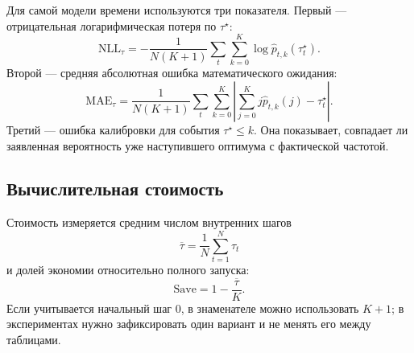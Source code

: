 Для самой модели времени используются три показателя. Первый --- отрицательная логарифмическая потеря по \(\tau^\star\):
\begin{equation}
  \mathrm{NLL}_{\tau}=-\frac{1}{N(K+1)}\sum_t\sum_{k=0}^{K}\log\widehat p_{t,k}(\tau_t^\star).
  \label{eq:tau_nll}
\end{equation}
Второй --- средняя абсолютная ошибка математического ожидания:
\begin{equation}
  \mathrm{MAE}_{\tau}=\frac{1}{N(K+1)}\sum_t\sum_{k=0}^{K}
  \left|\sum_{j=0}^{K}j\widehat p_{t,k}(j)-\tau_t^\star\right|.
  \label{eq:tau_mae}
\end{equation}
Третий --- ошибка калибровки для события \(\tau^\star\le k\). Она показывает, совпадает ли заявленная вероятность уже наступившего оптимума с фактической частотой.

\subsection{Вычислительная стоимость}

Стоимость измеряется средним числом внутренних шагов
\begin{equation}
  \overline\tau=\frac{1}{N}\sum_{t=1}^{N}\tau_t
  \label{eq:mean_tau}
\end{equation}
и долей экономии относительно полного запуска:
\begin{equation}
  \mathrm{Save}=1-\frac{\overline\tau}{K}.
  \label{eq:saving}
\end{equation}
Если учитывается начальный шаг \(0\), в знаменателе можно использовать \(K+1\); в экспериментах нужно зафиксировать один вариант и не менять его между таблицами.

